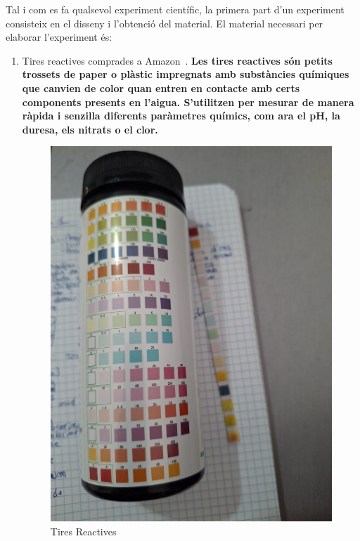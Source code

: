 Tal i com es fa qualsevol experiment científic, la primera part d'un experiment consisteix en el disseny i l'obtenció del material. El material necessari per elaborar l'experiment és:
\begin{enumerate}
 \item
  Tires reactives comprades a Amazon~\cite{tiresReactives}. \textbf{Les tires reactives són petits trossets de paper o plàstic impregnats amb substàncies químiques que canvien de color quan entren en contacte amb certs components presents en l’aigua. S’utilitzen per mesurar de manera ràpida i senzilla diferents paràmetres químics, com ara el pH, la duresa, els nitrats o el clor.}

  \begin{minipage}[h]{0.45\textwidth}
  \begin{figure}[H]
      \centering
      \includegraphics[width=1\textwidth, angle=270]{./Figures/TIres.png}
      \caption{Tires Reactives}
      \label{fig:TiresReactives}

\end{figure}
\end{minipage}
\end{enumerate}
